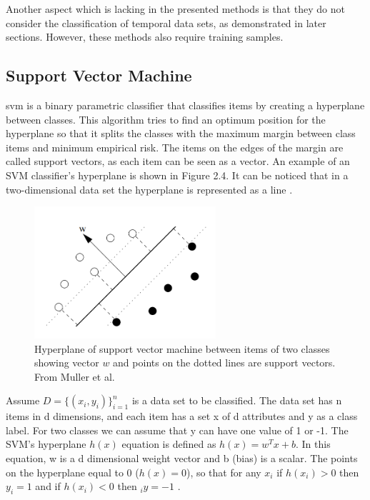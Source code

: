 Another aspect which is lacking in the presented methods is that they do not consider the classification of temporal data sets, as demonstrated in later sections. However, these methods also require training samples.



\subsection{Support Vector Machine}

\acrfull{svm} is a binary parametric classifier that classifies items by creating a hyperplane between classes. This algorithm tries to find an optimum position for the hyperplane so that it splits the classes with the maximum margin between class items and minimum empirical risk. The items on the edges of the margin are called support vectors, as each item can be seen as a vector. An example of an SVM classifier's hyperplane is shown in Figure 2.4. It can be noticed that in a two-dimensional data set the hyperplane is represented as a line \cite{Muller2001}.

\begin{figure}[!h]
    \includegraphics[width=0.6\textwidth]{images/chapter2/SVM.png}  
    \caption{Hyperplane of support vector machine between items of two classes showing vector $w$ and points on the dotted lines are support vectors. From Muller et al. \cite{Muller2001}}
    \label{fig:svmClassifier}
\end{figure}

Assume $D = \{(x_i, y_i)\}^n_{i=1}$ is a data set to be classified. The data set has n items in d dimensions, and each item has a set x of d attributes and y as a class label. For two classes we can assume that y can have one value of 1 or -1. The SVM's hyperplane $h(x)$ equation is defined as $h(x) = w^Tx+ b$. In this equation, w is a d dimensional weight vector and b (bias) is a scalar. The points on the hyperplane equal to 0 ($h(x) = 0$), so that for any $x_i$ if $h(x_i) > 0$ then $y_i = 1$ and if $h(x_i) < 0$ then $_iy = -1$ \cite{Zaki2014}. 

